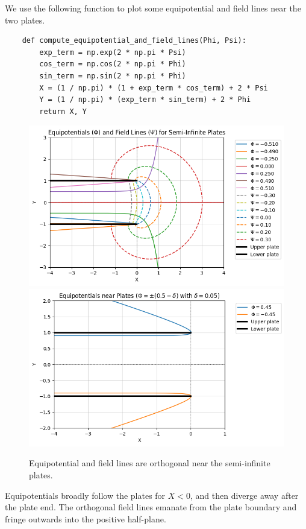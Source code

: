 \documentclass{article}
\begin{document}
We use the following function to plot some equipotential and field lines near the two plates.

\begin{verbatim}
    def compute_equipotential_and_field_lines(Phi, Psi):
        exp_term = np.exp(2 * np.pi * Psi)
        cos_term = np.cos(2 * np.pi * Phi)
        sin_term = np.sin(2 * np.pi * Phi)
        X = (1 / np.pi) * (1 + exp_term * cos_term) + 2 * Psi
        Y = (1 / np.pi) * (exp_term * sin_term) + 2 * Phi
        return X, Y
\end{verbatim}

\begin{figure}
    \centering
    \includegraphics[width=1.0\linewidth]{images/equipfield.png}
    \includegraphics[width=1.0\linewidth]{images/equipnear.png}
    \caption{Equipotential and field lines are orthogonal near the semi-infinite plates.}
\end{figure}
Equipotentials broadly follow the plates for \(X < 0\), and then diverge away after the plate end. The orthogonal field lines emanate from the plate boundary and fringe outwards into the positive half-plane.
\end{document}
